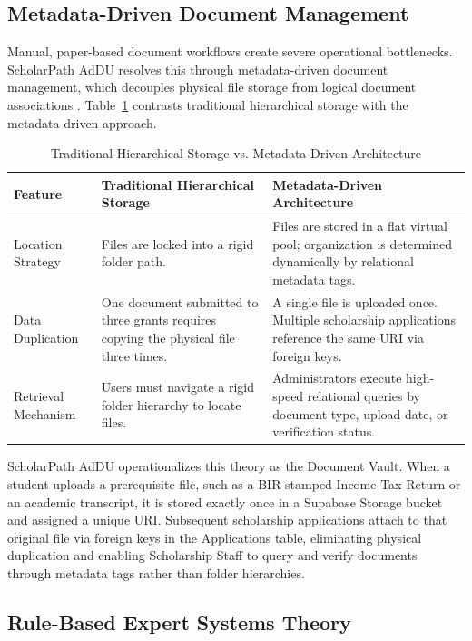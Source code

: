 \subsection{Metadata-Driven Document Management}

Manual, paper-based document workflows create severe operational bottlenecks. ScholarPath AdDU resolves this through metadata-driven document management, which decouples physical file storage from logical document associations \cite{ref25}. Table~\ref{tab:vault} contrasts traditional hierarchical storage with the metadata-driven approach. \begin{table}[htbp]
  \centering
  \small
  \caption{Traditional Hierarchical Storage vs. Metadata-Driven Architecture}
  \label{tab:vault}
  \begin{tabular}{@{}p{2.8cm} p{5.5cm} p{5.5cm}@{}}
    \toprule
    Feature & Traditional Hierarchical Storage & Metadata-Driven Architecture \\
    \midrule
    Location Strategy & Files are locked into a rigid folder path. & Files are stored in a flat virtual pool; organization is determined dynamically by relational metadata tags. \\
    \addlinespace
    Data Duplication & One document submitted to three grants requires copying the physical file three times. & A single file is uploaded once. Multiple scholarship applications reference the same URI via foreign keys. \\
    \addlinespace
    Retrieval Mechanism & Users must navigate a rigid folder hierarchy to locate files. & Administrators execute high-speed relational queries by document type, upload date, or verification status. \\
    \bottomrule
  \end{tabular}
\end{table}
 ScholarPath AdDU operationalizes this theory as the Document Vault. When a student uploads a prerequisite file, such as a BIR-stamped Income Tax Return or an academic transcript, it is stored exactly once in a Supabase Storage bucket and assigned a unique URI. Subsequent scholarship applications attach to that original file via foreign keys in the Applications table, eliminating physical duplication and enabling Scholarship Staff to query and verify documents through metadata tags rather than folder hierarchies.

\subsection{Rule-Based Expert Systems Theory}


